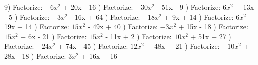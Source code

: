 \documentclass{article}%
\begin{document}
9) Factorize: $-6x^2$ + 20x - 16%
\newline%
\newline%
) Factorize: $-30x^2$ - 51x - 9%
\newline%
\newline%
) Factorize: $6x^2$ + 13x - 5%
\newline%
\newline%
) Factorize: $-3x^2$ - 16x + 64%
\newline%
\newline%
) Factorize: $-18x^2$ + 9x + 14%
\newline%
\newline%
) Factorize: $6x^2$ - 19x + 14%
\newline%
\newline%
) Factorize: $15x^2$ - 49x + 40%
\newline%
\newline%
) Factorize: $-3x^2$ + 15x - 18%
\newline%
\newline%
) Factorize: $15x^2$ + 6x - 21%
\newline%
\newline%
) Factorize: $15x^2$ - 11x + 2%
\newline%
\newline%
) Factorize: $10x^2$ + 51x + 27%
\newline%
\newline%
) Factorize: $-24x^2$ + 74x - 45%
\newline%
\newline%
) Factorize: $12x^2$ + 48x + 21%
\newline%
\newline%
) Factorize: $-10x^2$ + 28x - 18%
\newline%
\newline%
) Factorize: $3x^2$ + 16x + 16%
\end{document}
